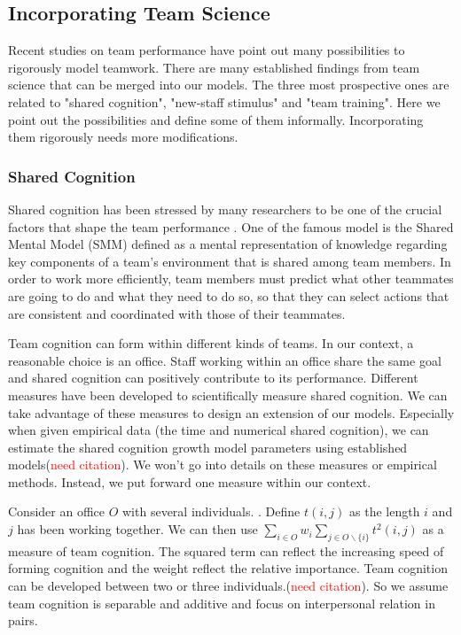 \documentclass[tcn = 37075, sheet = false, abstract = false]{mcmthesis}
\begin{document}
\subsection{Incorporating Team Science}

Recent studies on team performance have point out many possibilities to rigorously model teamwork.\cite{salas2008teams} There are many established findings from team science that can be merged into our models. The three most prospective ones are related to "shared cognition", "new-staff stimulus" and "team training". Here we point out the possibilities and define some of them informally. Incorporating them rigorously needs more modifications.

\subsubsection{Shared Cognition}

Shared cognition has been stressed by many researchers to be one of the crucial factors that shape the team performance \cite{cannon2001reflections}. One of the famous model is the Shared Mental Model (SMM) defined as a mental representation of knowledge regarding key components of a team's environment that is shared among team members\cite{nandkeolyar2008teams}. In order to work more efficiently, team members must predict what other teammates are going to do and what they need to do so, so that they can select actions that are consistent and coordinated with those of their teammates. \cite{mathieu2000influence}

Team cognition can form within different kinds of teams. In our context, a reasonable choice is an office. Staff working within an office share the same goal and shared cognition can positively contribute to its performance. Different measures have been developed to scientifically measure shared cognition\cite{cannon2001reflections}. We can take advantage of these measures to design an extension of our models. Especially when given empirical data (the time and numerical shared cognition), we can estimate the shared cognition growth model parameters using established models(\textcolor{red}{need citation}). We won't go into details on these measures or empirical methods. Instead, we put forward one measure within our context.

Consider an office $O$ with several individuals. . Define $t(i,j)$ as the length $i$ and $j$ has been working together. We can then use $\sum\limits_{i\in O}w_i\sum\limits_{j\in O\backslash \{i\}}t^2(i,j)$ as a measure of team cognition. The squared term can reflect the increasing speed of forming cognition and the weight reflect the relative importance.  Team cognition can be developed between two or three individuals.(\textcolor{red}{need citation}). So we assume team cognition is separable and additive and focus on interpersonal relation in pairs.
\end{document}
